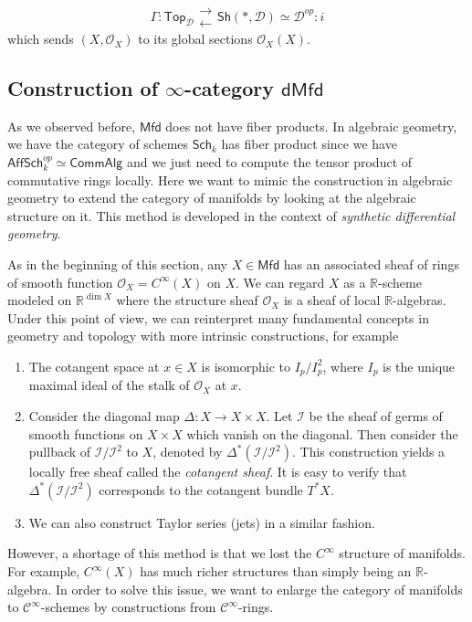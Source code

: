 \documentclass[11pt]{amsart}
\numberwithin{equation}{section}
\theoremstyle{definition}
\theoremstyle{remark}
\numberwithin{equation}{section}
\newcommand{\CO}{{\mathcal O}}
\newcommand{\cinf}{{\mathcal C}^{\infty}}
\newcommand{\R}{{\mathbb{R}}}
\newcommand{\sh}{\mathsf{Sh}}
\newcommand{\sch}{\mathsf{Sch}}
\newcommand{\aff}{\mathsf{Aff}}
\newcommand{\mfd}{\mathsf{Mfd}}
\newcommand{\dmfd}{\mathsf{dMfd}}
\newcommand{\calg}{\mathsf{CommAlg}}
\newcommand{\Top}{\mathsf{Top}}
\begin{document}
\begin{equation*}
\Gamma: \Top_{\mathscr{D}} \substack{\longrightarrow\\[-1em]  \longleftarrow}\sh(*, \mathscr{D})\simeq \mathscr{D}^{op} : i
\end{equation*}
which sends $(X, \CO_X)$ to its global sections $\CO_X(X)$.
\subsection{Construction of $\infty$-category $\dmfd$}

As we observed before, $\mfd$ does not have fiber products. In algebraic geometry, we have the category of schemes $\sch_k$ has fiber product since we have $\aff\sch^{op}_k\simeq \calg$ and we just need to compute the tensor product of commutative rings locally. Here we want to mimic the construction in algebraic geometry to extend the category of manifolds by looking at the algebraic structure on it. This method is developed in the context of {\it synthetic differential geometry}.

As in the beginning of this section, any $X\in \mfd$ has an associated sheaf of rings of smooth function $\CO_X=C^{\infty}(X)$ on $X$. We can regard $X$ as a $\R$-scheme modeled on $\R^{\dim X}$ where the structure sheaf $\CO_X$ is a sheaf of local $\R$-algebras. Under this point of view, we can reinterpret many fundamental concepts in geometry and topology with more intrinsic constructions, for example
\begin{enumerate}
	\item The cotangent space at $x\in X$ is isomorphic to $I_p/I_p^2$, where $I_p$ is the unique maximal ideal of the stalk of $\CO_X$ at $x$.
	\item Consider the diagonal map $\Delta: X\to X\times X$. Let $\mathcal{I}$ be the sheaf of germs of smooth functions on $X\times X$ which vanish on the diagonal. Then consider the pullback of $\mathcal{I}/\mathcal{I}^2$ to $X$, denoted by $ \Delta^*( \mathcal{I}/\mathcal{I}^2)$. This construction yields a locally free sheaf called the {\it cotangent sheaf}. It is easy to verify that $ \Delta^*( \mathcal{I}/\mathcal{I}^2)$ corresponds to the cotangent bundle $T^*X$.
	\item We can also construct Taylor series (jets) in a similar fashion.
\end{enumerate}

However, a shortage of this method is that we lost the $C^{\infty}$ structure of manifolds. For example, $C^{\infty}(X)$ has much richer structures than simply being an $\R$-algebra. In order to solve this issue, we want to enlarge the category of manifolds to $\cinf$-schemes by constructions from $\cinf$-rings.
\end{document}
